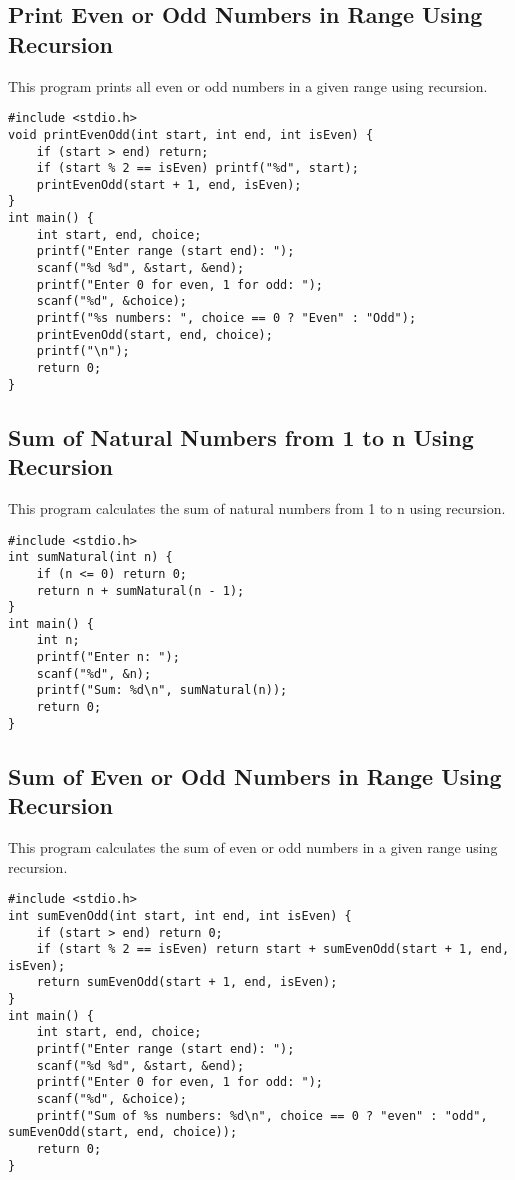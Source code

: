 \documentclass[a4paper,12pt]{article}
\begin{document}
\subsection{Print Even or Odd Numbers in Range Using Recursion}
This program prints all even or odd numbers in a given range using recursion.
\begin{lstlisting}[caption={Print Even or Odd Numbers in Range Using Recursion}]
#include <stdio.h>
void printEvenOdd(int start, int end, int isEven) {
    if (start > end) return;
    if (start % 2 == isEven) printf("%d", start);
    printEvenOdd(start + 1, end, isEven);
}
int main() {
    int start, end, choice;
    printf("Enter range (start end): ");
    scanf("%d %d", &start, &end);
    printf("Enter 0 for even, 1 for odd: ");
    scanf("%d", &choice);
    printf("%s numbers: ", choice == 0 ? "Even" : "Odd");
    printEvenOdd(start, end, choice);
    printf("\n");
    return 0;
}
\end{lstlisting}
\clearpage

\subsection{Sum of Natural Numbers from 1 to n Using Recursion}
This program calculates the sum of natural numbers from 1 to n using recursion.
\begin{lstlisting}[caption={Sum of Natural Numbers from 1 to n Using Recursion}]
#include <stdio.h>
int sumNatural(int n) {
    if (n <= 0) return 0;
    return n + sumNatural(n - 1);
}
int main() {
    int n;
    printf("Enter n: ");
    scanf("%d", &n);
    printf("Sum: %d\n", sumNatural(n));
    return 0;
}
\end{lstlisting}
\clearpage

\subsection{Sum of Even or Odd Numbers in Range Using Recursion}
This program calculates the sum of even or odd numbers in a given range using recursion.
\begin{lstlisting}[caption={Sum of Even or Odd Numbers in Range Using Recursion}]
#include <stdio.h>
int sumEvenOdd(int start, int end, int isEven) {
    if (start > end) return 0;
    if (start % 2 == isEven) return start + sumEvenOdd(start + 1, end, isEven);
    return sumEvenOdd(start + 1, end, isEven);
}
int main() {
    int start, end, choice;
    printf("Enter range (start end): ");
    scanf("%d %d", &start, &end);
    printf("Enter 0 for even, 1 for odd: ");
    scanf("%d", &choice);
    printf("Sum of %s numbers: %d\n", choice == 0 ? "even" : "odd", sumEvenOdd(start, end, choice));
    return 0;
}
\end{lstlisting}
\clearpage
\end{document}
